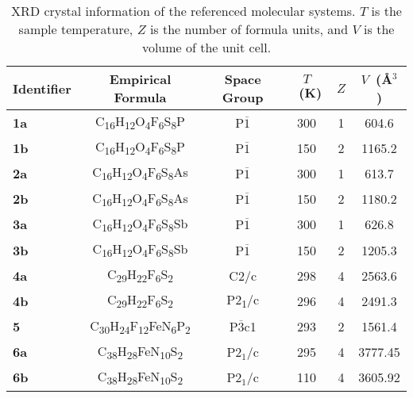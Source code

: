 \begin{table}[htp!]
  \centering
  \renewcommand*{\arraystretch}{1.5}{
    \begin{tabular}{ C{1.8cm} c c c c c }
      \toprule
      Identifier & Empirical Formula & Space Group & $T$~(K) & $Z$ & $V$~(\AA$^3$) \\
      \midrule
      \textbf{1a} & C\textsubscript{16}H\textsubscript{12}O\textsubscript{4}F\textsubscript{6}S\textsubscript{8}P  & P$\overline{1}$ & 300 & 1 & 604.6 \\
      \textbf{1b} & C\textsubscript{16}H\textsubscript{12}O\textsubscript{4}F\textsubscript{6}S\textsubscript{8}P  & P$\overline{1}$ & 150 & 2 & 1165.2 \\
      \textbf{2a} & C\textsubscript{16}H\textsubscript{12}O\textsubscript{4}F\textsubscript{6}S\textsubscript{8}As & P$\overline{1}$ & 300 & 1 & 613.7 \\
      \textbf{2b} & C\textsubscript{16}H\textsubscript{12}O\textsubscript{4}F\textsubscript{6}S\textsubscript{8}As & P$\overline{1}$ & 150 & 2 & 1180.2 \\
      \textbf{3a} & C\textsubscript{16}H\textsubscript{12}O\textsubscript{4}F\textsubscript{6}S\textsubscript{8}Sb & P$\overline{1}$ & 300 & 1 & 626.8 \\
      \textbf{3b} & C\textsubscript{16}H\textsubscript{12}O\textsubscript{4}F\textsubscript{6}S\textsubscript{8}Sb & P$\overline{1}$ & 150 & 2 & 1205.3 \\
      \textbf{4a} & C\textsubscript{29}H\textsubscript{22}F\textsubscript{6}S\textsubscript{2} & C2/c                  & 298 & 4 & 2563.6 \\
      \textbf{4b} & C\textsubscript{29}H\textsubscript{22}F\textsubscript{6}S\textsubscript{2} & P2\textsubscript{1}/c & 296 & 4 & 2491.3 \\
      \textbf{5}  & C\textsubscript{30}H\textsubscript{24}F\textsubscript{12}FeN\textsubscript{6}P\textsubscript{2} & P$\overline{3}$c1 & 293 & 2 & 1561.4 \\
      \textbf{6a} & C\textsubscript{38}H\textsubscript{28}FeN\textsubscript{10}S\textsubscript{2} & P2$_1$/c & 295 & 4 & 3777.45 \\
      \textbf{6b} & C\textsubscript{38}H\textsubscript{28}FeN\textsubscript{10}S\textsubscript{2} & P2$_1$/c & 110 & 4 & 3605.92 \\
      \bottomrule
    \end{tabular}
  }
  \caption{XRD crystal information of the referenced molecular systems.
    $T$ is the sample temperature, $Z$ is the number of formula units, and $V$ is the volume of the unit cell.}
  \label{tab: cif1}
\end{table}

